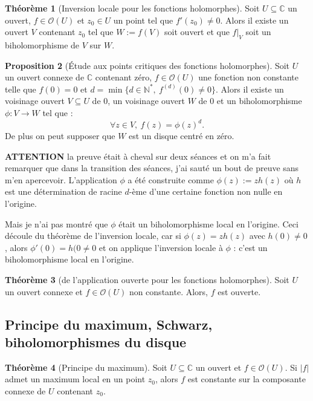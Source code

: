 \documentclass[11pt,a4paper]{article}
\newcommand{\N}{\mathbb{N}}
\newcommand{\C}{\mathbb{C}}
\theoremstyle{definition}
\newtheorem{theoreme}{Th\'eor\`eme}[section]
\newtheorem{proposition}[theoreme]{Proposition}
\theoremstyle{plain}
\begin{document}
\begin{theoreme}[Inversion locale pour les fonctions holomorphes]
Soit $U\subseteq \C$ un ouvert, $f\in \mathcal O(U)$ et $z_0\in U$ un point tel que $f'(z_0)\neq 0$.
Alors il existe un ouvert $V$ contenant $z_0$ tel que $W:=f(V)$ soit ouvert et que $f|_V$ soit un biholomorphisme de $V$ sur $W$.
\end{theoreme}

\begin{proposition}[Étude aux points critiques des fonctions holomorphes]
Soit $U$ un ouvert connexe de $\C$ contenant zéro, $f\in \mathcal O(U)$ une fonction non constante telle que $f(0)=0$ et $d = \min\{d\in \N^*,\: f^{(d)}(0)\neq 0\}$.
Alors il existe un voisinage ouvert $V\subseteq U$ de $0$, un voisinage ouvert  $W$ de $0$ et un biholomorphisme $\phi : V\to W$ tel que : 
\[ \forall z\in V, \: f(z) = \phi(z)^d. \]
De plus on peut supposer que $W$ est un disque centré en zéro.
\end{proposition}

\textbf{ATTENTION} la preuve était à cheval sur deux séances et on m'a fait remarquer que dans la transition des séances, j'ai sauté un bout de preuve sans m'en apercevoir. L'application $\phi$ a été construite  comme $\phi(z) := zh(z)$  où $h$ est une détermination de racine $d$-ème d'une certaine fonction non nulle en l'origine. 

Mais je n'ai pas montré que $\phi$ était un biholomorphisme local en l'origine. Ceci découle du théorème de l'inversion locale, car si $\phi(z) = zh(z)$ avec $h(0)\neq 0$, alors $\phi'(0) = h(0 \neq 0$ et on applique l'inversion locale à $\phi$ :   c'est un biholomorphisme local en l'origine.


\begin{theoreme}[de l'application ouverte pour les fonctions holomorphes]
Soit $U$ un ouvert connexe et $f\in \mathcal O(U)$ non constante.
Alors, $f$ est ouverte.
\end{theoreme}



\subsection{Principe du maximum, Schwarz, biholomorphismes du disque}
 
\begin{theoreme}[Principe du maximum]
Soit $U\subseteq \C$ un ouvert et $f \in \mathcal O(U)$.
Si $|f|$ admet un maximum local en un point $z_0$, alors $f$ est constante sur la composante connexe  de $U$ contenant $z_0$.
\end{theoreme}
\end{document}
